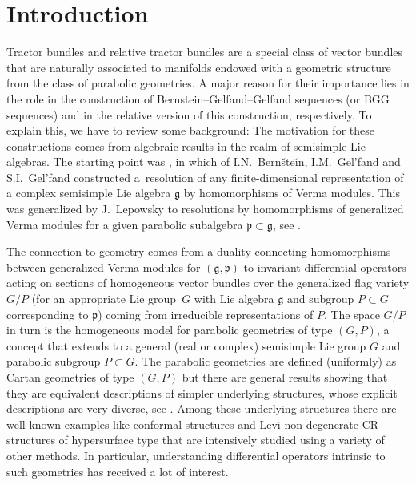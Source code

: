 \documentclass[pdftex]{sigma}
\numberwithin{equation}{section}
\def\frak{\mathfrak}
\begin{document}


\section{Introduction}\label{1}
Tractor bundles and relative tractor bundles are a special class of vector bundles
that are naturally associated to manifolds endowed with a geometric structure from
the class of parabolic geometries. A major reason for their importance lies in the
role in the construction of Bernstein--Gelfand--Gelfand sequences (or BGG sequences)
and in the relative version of this construction, respectively. To explain this, we
have to review some background: The motivation for these constructions comes from
algebraic results in the realm of semisimple Lie algebras. The starting point was
\cite{BGG}, in which of I.N.~Bern{\v{s}}te{\u\i}n, I.M.~Gel'fand and S.I.~Gel'fand constructed a~resolution of any finite-dimensional
representation of a complex semisimple Lie algebra $\frak g$ by homomorphisms of
Verma modules. This was generalized by J.~Lepowsky to resolutions by homomorphisms of
generalized Verma modules for a given parabolic subalgebra $\frak p\subset\frak g$,
see \cite{Lepowsky}.

The connection to geometry comes from a duality connecting homomorphisms between
generalized Verma modules for $(\frak g,\frak p)$ to invariant differential operators
acting on sections of homogeneous vector bundles over the generalized flag variety
$G/P$ (for an appropriate Lie group~$G$ with Lie algebra $\frak g$ and subgroup
$P\subset G$ corresponding to $\frak p$) coming from irreducible representations of
$P$. The space $G/P$ in turn is the homogeneous model for parabolic geometries of
type $(G,P)$, a concept that extends to a general (real or complex) semisimple Lie
group $G$ and parabolic subgroup $P\subset G$. The parabolic geometries are defined
(uniformly) as Cartan geometries of type $(G,P)$ but there are general results
showing that they are equivalent descriptions of simpler underlying structures,
whose explicit descriptions are very diverse, see \cite{book}. Among these underlying
structures there are well-known examples like conformal structures and
Levi-non-degenerate CR structures of hypersurface type that are intensively studied
using a variety of other methods. In particular, understanding differential operators
intrinsic to such geometries has received a lot of interest.
\end{document}

